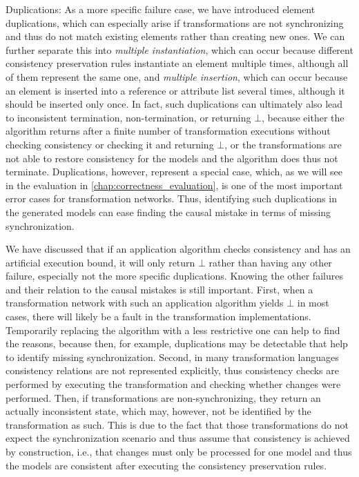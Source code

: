 \begin{properdescription}
    \item[Duplications:] %
    As a more specific failure case, we have introduced element duplications, which can especially arise if transformations are not synchronizing and thus do not match existing elements rather than creating new ones.
    We can further separate this into \emph{multiple instantiation}, which can occur because different consistency preservation rules instantiate an element multiple times, although all of them represent the same one, and \emph{multiple insertion}, which can occur because an element is inserted into a reference or attribute list several times, although it should be inserted only once. 
    In fact, such duplications can ultimately also lead to inconsistent termination, non-termination, or returning $\bot$, because either the algorithm returns after a finite number of transformation executions without checking consistency or checking it and returning $\bot$, or the transformations are not able to restore consistency for the models and the algorithm does thus not terminate.
    Duplications, however, represent a special case, which, as we will see in the evaluation in \autoref{chap:correctness_evaluation}, is one of the most important error cases for transformation networks.
    Thus, identifying such duplications in the generated models can ease finding the causal mistake in terms of missing synchronization.
\end{properdescription}

We have discussed that if an application algorithm checks consistency and has an artificial execution bound, it will only return $\bot$ rather than having any other failure, especially not the more specific duplications. Knowing the other failures and their relation to the causal mistakes is still important.
First, when a transformation network with such an application algorithm yields $\bot$ in most cases, there will likely be a fault in the transformation implementations.
Temporarily replacing the algorithm with a less restrictive one can help to find the reasons, because then, for example, duplications may be detectable that help to identify missing synchronization.
Second, in many transformation languages consistency relations are not represented explicitly, thus consistency checks are performed by executing the transformation and checking whether changes were performed.
Then, if transformations are non-synchronizing, they return an actually inconsistent state, which may, however, not be identified by the transformation as such.
This is due to the fact that those transformations do not expect the synchronization scenario and thus assume that consistency is achieved by construction, i.e., that changes must only be processed for one model and thus the models are consistent after executing the consistency preservation rules.

